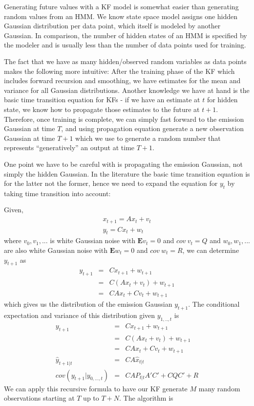 Generating future values with a KF model is somewhat easier than generating
random values from an HMM. We know state space model assigns one hidden Gaussian
distribution per data point, which itself is modeled by another Gaussian. In
comparison, the number of hidden states of an HMM is specified by the modeler
and is usually less than the number of data points used for training.

The fact that we have as many hidden/observed random variables as data points
makes the following more intuitive: After the training phase of the KF which
includes forward recursion and smoothing, we have estimates for the mean and
variance for all Gaussian distributions. Another knowledge we have at hand is
the basic time transition equation for KFs - if we have an estimate at $t$ for
hidden state, we know how to propagate those estimates to the future at
$t+1$. Therefore, once training is complete, we can simply fast forward to the
emission Gaussian at time $T$, and using propagation equation generate a new
observation Gaussian at time $T+1$ which we use to generate a random number that
represents ``generatively'' an output at time $T+1$.

One point we have to be careful with is propagating the emission Gaussian, not
simply the hidden Gaussian. In the literature the basic time transition equation
is for the latter not the former, hence we need to expand the equation for $y_t$
by taking time transition into account:

Given,
\begin{eqnarray*}
x_{t+1} = Ax_t + v_t \\
y_t = Cx_t + w_t
\end{eqnarray*}
where $v_0,v_1,...$ is white Gaussian noise with $\mathbf{E}v_t = 0$ and $cov \:
v_t = Q$ and $w_0,w_1,...$ are also white Gaussian noise with $\mathbf{E}w_t =
0$ and $cov \: w_t = R$, we can determine $y_{t+1}$ as
\begin{eqnarray*}
y_{t+1} &=& Cx_{t+1} + w_{t+1}\\
&=& C(Ax_t + v_t) + w_{t+1} \\
&=& CAx_t + Cv_t + w_{t+1}
\end{eqnarray*}
which gives us the distribution of the emission Gaussian $y_{t+1}$. The
conditional expectation and variance of this distribution given $y_{1,..,t}$ is
\begin{eqnarray*}
y_{t+1} &=& Cx_{t+1} + w_{t+1}\\
&=& C(Ax_t + v_t) + w_{t+1} \\
&=& CAx_t + Cv_t + w_{t+1} \\
\hat{y}_{t+1|t} &=& CA\hat{x}_{t|t} \\
cov(y_{t+1}|y_{0,...,t}) &=& CA P_{t|t}A'C' + CQC' + R
\end{eqnarray*}
We can apply this recursive formula to have our KF generate $M$ many random
observations starting at $T$ up to $T+N$. The algorithm is

